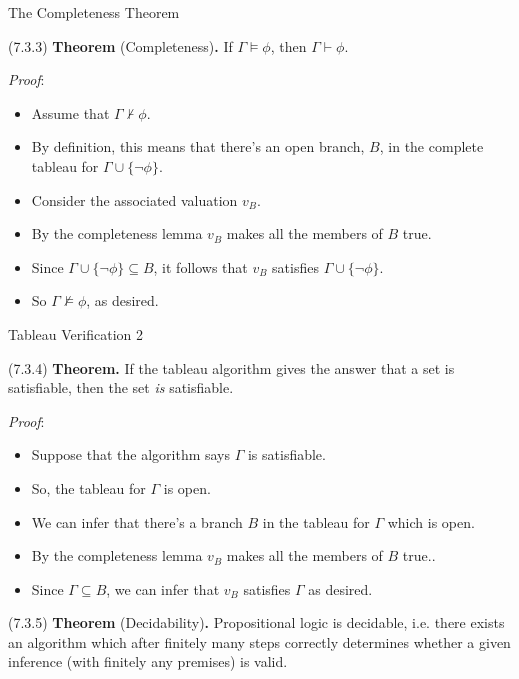 \begin{frame}{The Completeness Theorem}

(7.3.3) \textbf{Theorem} (Completeness)\textbf{.} If $\Gamma\vDash\phi$, then $\Gamma\vdash\phi$.

\emph{Proof}:

	\begin{itemize}
		
		\item Assume that $\Gamma\nvdash\phi$.
		
		\item By definition, this means that there's an open branch, $B$, in the complete tableau for $\Gamma\cup\{\neg\phi\}$.
		
		\item Consider the associated valuation $v_B$.
		
		\item By the completeness lemma $v_B$ makes all the members of $B$ true.
		
		\item Since $\Gamma\cup\{\neg\phi\}\subseteq B$, it follows that $v_B$ satisfies $\Gamma\cup\{\neg\phi\}$.
		
		\item So $\Gamma\nvDash\phi$, as desired.
	
	\end{itemize}

\end{frame}

\begin{frame}{Tableau Verification 2}

	(7.3.4) \textbf{Theorem.} If the tableau algorithm gives the answer that a set is satisfiable, then the set \emph{is} satisfiable.

	\emph{Proof}:
	
	\begin{itemize}
	
		\item Suppose that the algorithm says $\Gamma$ is satisfiable.
		
		\item So, the tableau for $\Gamma$ is open.
				
		\item We can infer that there's a branch $B$ in the tableau for $\Gamma$ which is open. 
	
		\item By the completeness lemma $v_B$ makes all the members of $B$ true..
		
		\item Since $\Gamma\subseteq B$, we can infer that $v_B$ satisfies $\Gamma$ as desired.
	
	\end{itemize}
	
	(7.3.5) \textbf{Theorem} (Decidability)\textbf{.} 	Propositional logic is decidable, i.e. there exists an algorithm which after finitely many steps correctly determines whether a given inference (with finitely any premises) is valid.


\end{frame}

